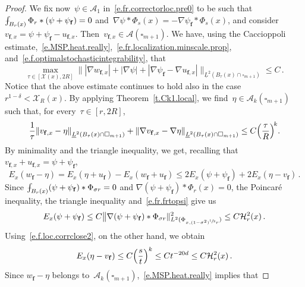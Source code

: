 \documentclass[11pt]{article} %
\let\oldsquare\square %
\renewcommand{\square}{\oldsquare}
\numberwithin{equation}{section}
\theoremstyle{definition}
\let\originalleft\left
\let\originalright\right
\renewcommand{\left}{\mathopen{}\mathclose\bgroup\originalleft}
\renewcommand{\right}{\aftergroup\egroup\originalright}
\newcommand{\f}{\mathbf{f}}
\newcommand{\cu}{\square}
\newcommand{\X}{\mathcal{X}}
\def\Xint#1{\mathchoice
{\XXint\displaystyle\textstyle{#1}}%
{\XXint\textstyle\scriptstyle{#1}}%
{\XXint\scriptstyle\scriptscriptstyle{#1}}%
{\XXint\scriptscriptstyle\scriptscriptstyle{#1}}%
\!\int}
\def\XXint#1#2#3{{\setbox0=\hbox{$#1{#2#3}{\int}$}
\vcenter{\hbox{$#2#3$}}\kern-.5\wd0}}
\def\fint{\Xint-}
\newcommand{\A}{\mathcal{A}}
\begin{document}
\begin{proof}
We fix now~$\psi \in \A_1$ in~\eqref{e.fr.correctorloc.pre0} to be such that~$\fint_{B_r(x)} \Phi_r \ast (\psi  + \psi_\f) = 0$ and~$\nabla \psi  \ast \Phi_{s}(x) = - \nabla \psi_\f \ast \Phi_{s}(x)$, and consider~$v_{\f,x} = \psi  + \psi_{\f} - u_{\f,x}$. Then~$v_{\f,x} \in \A(\cu_{m+1})$.  We have, using the Caccioppoli estimate,~\eqref{e.MSP.heat.really},~\eqref{e.fr.localization.minscale.prop},  and~\eqref{e.f.optimalstochasticintegrability}, that
\begin{equation}  \label{e.fr.local.bnd}
\max_{\tau \in [\X(x) , 2R]}\big\| |\nabla w_{\f,x} | +  |\nabla \psi | + |\nabla \psi_\f - \nabla u_{\f,x}| \big\|_{\underline{L}^2(B_\tau(x) \cap \cu_{m+1})} 
\leq 
C 
\,.
\end{equation}
Notice that the above estimate continues to hold also in the case~$ r^{1-\delta} < \X_{R}(x)$. 
By applying Theorem~\ref{t.Ck1.local}, 
we find~$\eta \in  \A_{k}(\cu_{m+1})$ such that, for every~$\tau  \in [r,2R]$, 
\begin{equation} \label{e.f.loc.corrclose2}
\frac1\tau \left\|  v_{\f,x} -  \eta \right\|_{\underline{L}^2 \left( B_{\tau}(x) \cap \cu_{m+1} \right)} 
+
\left\|  \nabla v_{\f,x} -   \nabla  \eta \right\|_{\underline{L}^2 \left( B_{\tau}(x) \cap \cu_{m+1} \right)} 
\leq 
C\left( \frac{\tau}{R}\right)^{\!k} .
\end{equation}
By minimality and the triangle inequality, we get, recalling that $v_{\f,x} + u_{\f,x} = \psi  + \psi_\f$,
\begin{equation*}  
E_x(w_\f-\eta) 
= 
E_x(\eta + u_\f) - E_x(w_\f + u_\f) 
\leq 
2 E_x(\psi  + \psi_\f) +  2 E_x(\eta - v_\f) 
\,.
\end{equation*}
Since $\fint_{B_r(x)} (\psi + \psi_\f) \ast \Phi_{\sigma r} = 0$ and $ \nabla (\psi  + \psi_\f) \ast \Phi_{r}(x) = 0$, the Poincar\'e inequality, the triangle inequality and~\eqref{e.fr.frtopsi} give us
\begin{equation*}  
E_x(\psi  + \psi_\f) 
\leq
C  \big\| \nabla (\psi  + \psi_\f) \ast \Phi_{\sigma r} \|_{L^2(\Phi_{x,(1-\sigma^2)^{\sfrac12} r})}^2
\leq
C \mathcal{H}_r^2(x) \,.
\end{equation*}
Using~\eqref{e.f.loc.corrclose2}, on the other hand, we obtain 
\begin{equation*}  
E_x(\eta - v_\f) 
\leq 
C \Bigl( \frac st \Bigr)^k 
 \leq 
 C t^{-20d}
 \leq
C \mathcal{H}_r^2(x)
\,.
\end{equation*}
Since $w_\f - \eta$ belongs to~$\A_k(\cu_{m+1})$,~\eqref{e.MSP.heat.really} implies that 

\end{proof}
\end{document}
